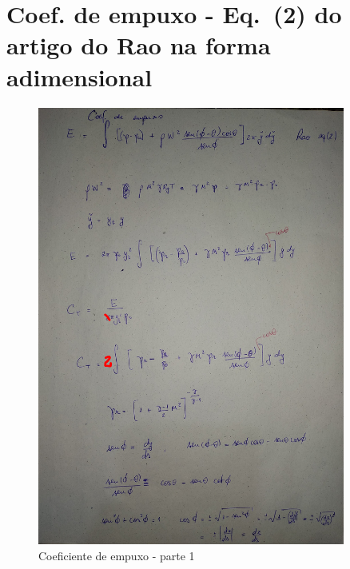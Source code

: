 \documentclass[12pt,a4paper]{article}
\begin{document}
\section{Coef. de empuxo - Eq.~(2) do artigo do Rao na forma adimensional}

\begin{figure}[!ht]
	\centering
	\includegraphics[width=0.90\textwidth]{./fig/CT1}
	\caption{Coeficiente de empuxo - parte 1}
	\label{fig:CT1}
\end{figure}
\end{document}
